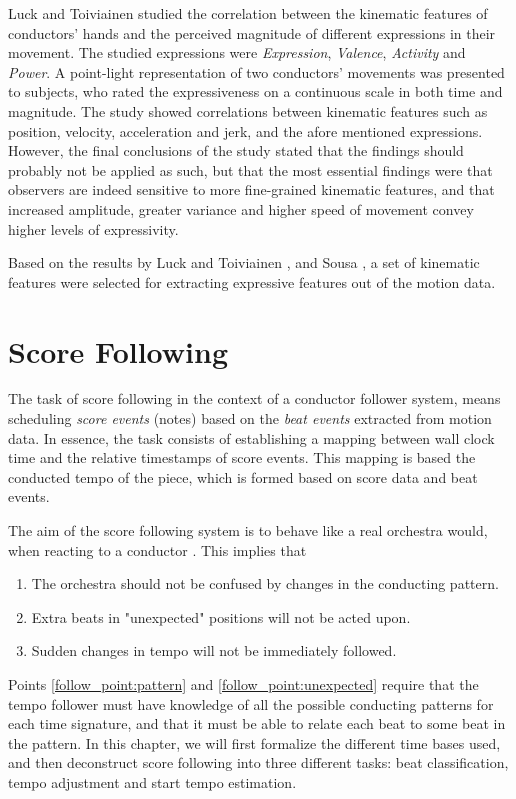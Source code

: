 Luck and Toiviainen \cite{luck2010}
studied the correlation between the kinematic features of conductors' hands
and the perceived magnitude of different expressions in their movement.
The studied expressions were
\textit{Expression}, \textit{Valence}, \textit{Activity} and \textit{Power}.
A point-light representation of two conductors' movements
was presented to subjects, who rated the expressiveness
on a continuous scale in both time and magnitude.
The study showed correlations between kinematic features
such as position, velocity, acceleration and jerk,
and the afore mentioned expressions.
However, the final conclusions of the study stated that
the findings should probably not be applied as such,
but that the most essential findings were that observers
are indeed sensitive to more fine-grained kinematic features,
and that increased amplitude, greater variance and higher speed of movement
convey higher levels of expressivity.

Based on the results by Luck and Toiviainen \cite{luck2010},
and Sousa \cite{sousa1988},
a set of kinematic features were selected for extracting
expressive features out of the motion data.

\chapter{Score Following}
\label{chapter:score_following}

The task of score following in the context
of a conductor follower system,
means scheduling \textit{score events} (notes)
based on the \textit{beat events} extracted
from motion data.
In essence, the task consists of establishing a mapping between
wall clock time and the relative timestamps of score events.
This mapping is based the conducted tempo of the piece,
which is formed based on score data and beat events.

The aim of the score following system
is to behave like a real orchestra would,
when reacting to a conductor \cite{findsomecites?}.
This implies that
\begin{enumerate}
\item The orchestra should not be confused by changes in the conducting pattern. \label{follow_point:pattern}
\item Extra beats in "unexpected" positions will not be acted upon. \label{follow_point:unexpected}
\item Sudden changes in tempo will not be immediately followed.
\end{enumerate}
Points \ref{follow_point:pattern} and \ref{follow_point:unexpected} require
that the tempo follower must have knowledge of all the possible
conducting patterns for each time signature,
and that it must be able to relate each beat to some beat in the pattern.
In this chapter,
we will first formalize the different time bases used,
and then deconstruct score following into
three different tasks:
beat classification, tempo adjustment and start tempo estimation.

